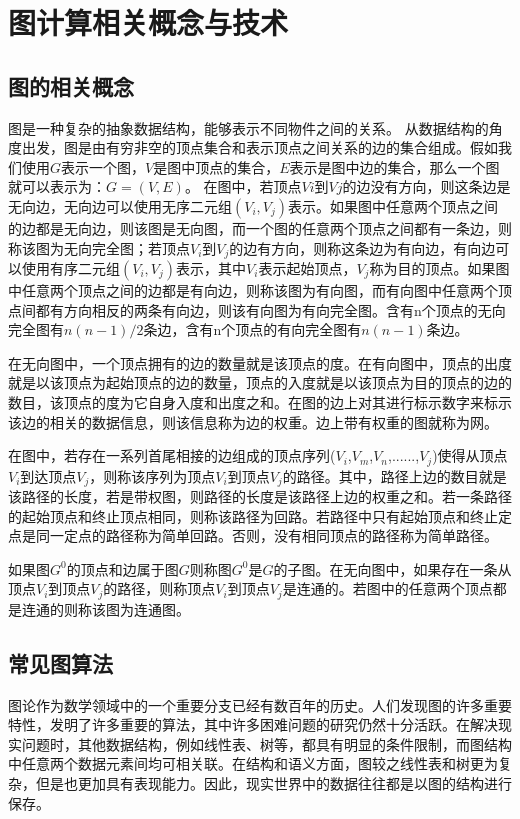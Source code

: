 
\chapter{图计算相关概念与技术}

\section{图的相关概念}
图是一种复杂的抽象数据结构，能够表示不同物件之间的关系。
从数据结构的角度出发，图是由有穷非空的顶点集合和表示顶点之间关系的边的集合组成。假如我们使用$G$表示一个图，$V$是图中顶点的集合，$E$表示是图中边的集合，那么一个图就可以表示为：$G=(V,E)$。
在图中，若顶点$Vi$到$Vj$的边没有方向，则这条边是无向边，无向边可以使用无序二元组$(V_i,V_j)$表示。如果图中任意两个顶点之间的边都是无向边，则该图是无向图，而一个图的任意两个顶点之间都有一条边，则称该图为无向完全图；若顶点$V_i$到$V_j$的边有方向，则称这条边为有向边，有向边可以使用有序二元组$(V_i,V_j)$表示，其中$V_i$表示起始顶点，$V_j$称为目的顶点。如果图中任意两个顶点之间的边都是有向边，则称该图为有向图，而有向图中任意两个顶点间都有方向相反的两条有向边，则该有向图为有向完全图。含有n个顶点的无向完全图有$n(n-1)/2$条边，含有n个顶点的有向完全图有$n(n-1)$条边。

在无向图中，一个顶点拥有的边的数量就是该顶点的度。在有向图中，顶点的出度就是以该顶点为起始顶点的边的数量，顶点的入度就是以该顶点为目的顶点的边的数目，该顶点的度为它自身入度和出度之和。在图的边上对其进行标示数字来标示该边的相关的数据信息，则该信息称为边的权重。边上带有权重的图就称为网。

在图中，若存在一系列首尾相接的边组成的顶点序列($V_i$,$V_m$,$V_n$,......,$V_j$)使得从顶点$V_i$到达顶点$V_j$，则称该序列为顶点$V_i$到顶点$V_j$的路径。其中，路径上边的数目就是该路径的长度，若是带权图，则路径的长度是该路径上边的权重之和。若一条路径的起始顶点和终止顶点相同，则称该路径为回路。若路径中只有起始顶点和终止定点是同一定点的路径称为简单回路。否则，没有相同顶点的路径称为简单路径。

如果图$G^0$的顶点和边属于图$G$则称图$G^0$是$G$的子图。在无向图中，如果存在一条从顶点$V_i$到顶点$V_j$的路径，则称顶点$V_i$到顶点$V_j$是连通的。若图中的任意两个顶点都是连通的则称该图为连通图。


\section{常见图算法}
图论作为数学领域中的一个重要分支已经有数百年的历史。人们发现图的许多重要特性，发明了许多重要的算法，其中许多困难问题的研究仍然十分活跃。在解决现实问题时，其他数据结构，例如线性表、树等，都具有明显的条件限制，而图结构中任意两个数据元素间均可相关联。在结构和语义方面，图较之线性表和树更为复杂，但是也更加具有表现能力。因此，现实世界中的数据往往都是以图的结构进行保存。


